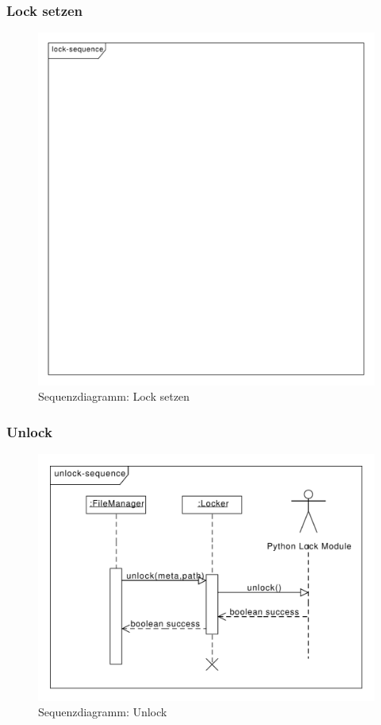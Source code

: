 \subsubsection{Lock setzen}
\begin{figure}[h]
	\centering
	\label{design:dia:sqc:lock}
	\includegraphics[width=\textwidth]{design/frontend/sequence/lock-sequence.pdf}
	\caption{Sequenzdiagramm: Lock setzen}
\end{figure}

\subsubsection{Unlock}
\begin{figure}[h]
	\centering
	\label{design:dia:sqc:unlock}
	\includegraphics[width=\textwidth]{design/frontend/sequence/unlock-sequence.pdf}
	\caption{Sequenzdiagramm: Unlock}
\end{figure}

